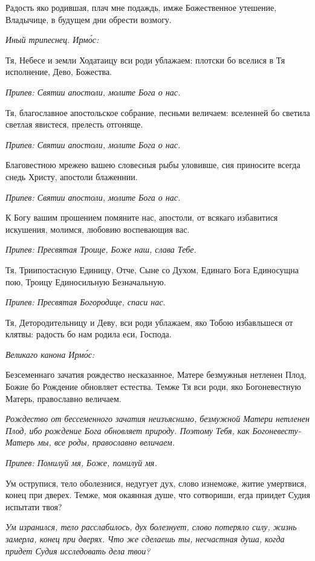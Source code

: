 Радость яко родившая, плач мне подаждь, имже Божественное утешение, Владычице, в будущем дни обрести возмогу.


\itshape Иный трипеснец. Ирмо́с:\normalfont{}


Тя, Небесе и земли Ходатаицу вси роди ублажаем: плотски бо вселися в Тя исполнение, Дево, Божества.


\itshape Припев:\normalfont{} Святии апостоли, молите Бога о нас.


Тя, благославное апостольское собрание, песньми величаем: вселенней бо светила светлая явистеся, прелесть отгоняще.


\itshape Припев:\normalfont{} Святии апостоли, молите Бога о нас.


Благовестною мрежею вашею словесныя рыбы уловивше, сия приносите всегда снедь Христу, апостоли блаженнии.


\itshape Припев:\normalfont{} Святии апостоли, молите Бога о нас.


К Богу вашим прошением помяните нас, апостоли, от всякаго избавитися искушения, молимся, любовию воспевающия вас.


\itshape Припев:\normalfont{} Пресвятая Троице, Боже наш, слава Тебе.


Тя, Триипостасную Единицу, Отче, Сыне со Духом, Единаго Бога Единосущна пою, Троицу Единосильную Безначальную.


\itshape Припев:\normalfont{} Пресвятая Богородице, спаси нас.


Тя, Детородительницу и Деву, вси роди ублажаем, яко Тобою избавльшеся от клятвы: радость бо нам родила еси, Господа.


\itshape Великаго канона Ирмо́с:\normalfont{}


Безсеменнаго зачатия рождество несказанное, Матере безмужныя нетленен Плод, Божие бо Рождение обновляет естества. Темже Тя вси роди, яко Богоневестную Матерь, православно величаем.


\itshape Рождество от бессеменного зачатия неизъяснимо, безмужной Матери нетленен Плод, ибо рождение Бога обновляет природу. Поэтому Тебя, как Богоневесту-Матерь мы, все роды, православно величаем.\normalfont{}


\itshape Припев:\normalfont{} Помилуй мя, Боже, помилуй мя.


Ум острупися, тело оболезнися, недугует дух, слово изнеможе, житие умертвися, конец при дверех. Темже, моя окаянная душе, что сотвориши, егда приидет Судия испытати твоя?


\itshape Ум изранился, тело расслабилось, дух болезнует, слово потеряло силу, жизнь замерла, конец при дверях. Что же сделаешь ты, несчастная душа, когда придет Судия исследовать дела твои?\normalfont{}


